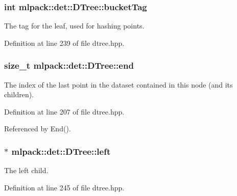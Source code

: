 \subsubsection[{bucket\-Tag}]{\setlength{\rightskip}{0pt plus 5cm}int mlpack\-::det\-::\-D\-Tree\-::bucket\-Tag\hspace{0.3cm}{\ttfamily [private]}}\label{classmlpack_1_1det_1_1DTree_a3e2b18a31fec540558bf72d66445607e}


The tag for the leaf, used for hashing points. 



Definition at line 239 of file dtree.\-hpp.

\subsubsection[{end}]{\setlength{\rightskip}{0pt plus 5cm}size\-\_\-t mlpack\-::det\-::\-D\-Tree\-::end\hspace{0.3cm}{\ttfamily [private]}}\label{classmlpack_1_1det_1_1DTree_ad4e24682f0ef2b6deec502d6c25d4ed5}


The index of the last point in the dataset contained in this node (and its children). 



Definition at line 207 of file dtree.\-hpp.



Referenced by End().

\subsubsection[{left}]{$\ast$ mlpack\-::det\-::\-D\-Tree\-::left\hspace{0.3cm}{\ttfamily [private]}}\label{classmlpack_1_1det_1_1DTree_a1227f46ae7181c386be6ede54fce6246}


The left child. 



Definition at line 245 of file dtree.\-hpp.



